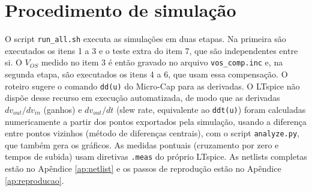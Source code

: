 \section{Procedimento de simulação}
\label{sec:procedimento}

O script \texttt{run\_all.sh} executa as simulações em duas etapas. Na
primeira são executados os itens 1 a 3 e o teste extra do item 7, que
são independentes entre si. O $V_{OS}$ medido no item 3 é então gravado
no arquivo \texttt{vos\_comp.inc} e, na segunda etapa, são executados os
itens 4 a 6, que usam essa compensação. O roteiro sugere o comando
\texttt{dd(u)} do Micro-Cap para as derivadas. O LTspice não dispõe
desse recurso em execução automatizada, de modo que as derivadas
$dv_{out}/dv_{in}$ (ganhos) e $dv_{out}/dt$ (slew rate, equivalente ao
\texttt{ddt(u)}) foram calculadas numericamente a partir dos pontos
exportados pela simulação, usando a diferença entre pontos vizinhos
(método de diferenças centrais), com o script \texttt{analyze.py}, que
também gera os gráficos. As medidas pontuais (cruzamento por zero e
tempos de subida) usam diretivas \texttt{.meas} do próprio LTspice. As
netlists completas estão no Apêndice \ref{ap:netlist} e os passos de
reprodução estão no Apêndice \ref{ap:reproducao}.
